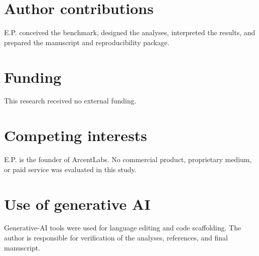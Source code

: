 \documentclass[11pt]{article}
\begin{document}
\section*{Author contributions}
E.P. conceived the benchmark, designed the analyses, interpreted the results, and prepared the manuscript and reproducibility package.

\section*{Funding}
This research received no external funding.

\section*{Competing interests}
E.P. is the founder of ArcentLabs. No commercial product, proprietary medium, or paid service was evaluated in this study.

\section*{Use of generative AI}
Generative-AI tools were used for language editing and code scaffolding. The author is responsible for verification of the analyses, references, and final manuscript.

\printbibliography
\end{document}
